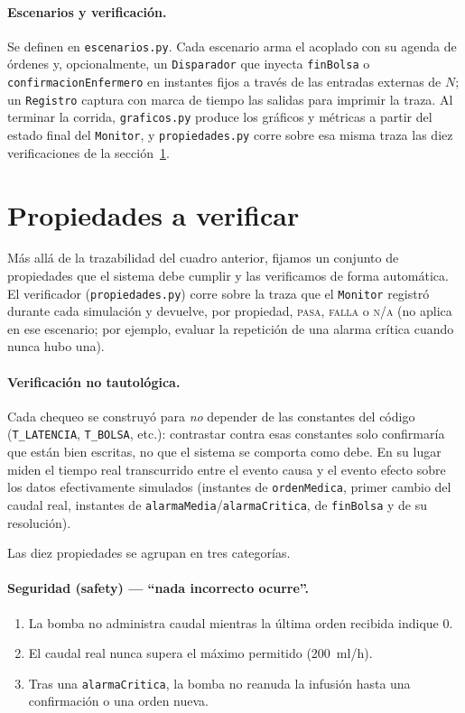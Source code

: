 \documentclass[11pt,a4paper]{article}
\begin{document}
\paragraph{Escenarios y verificación.} Se definen en \texttt{escenarios.py}. Cada escenario arma el acoplado con su agenda de órdenes y, opcionalmente, un \texttt{Disparador} que inyecta \texttt{finBolsa} o \texttt{confirmacionEnfermero} en instantes fijos a través de las entradas externas de $N$; un \texttt{Registro} captura con marca de tiempo las salidas para imprimir la traza. Al terminar la corrida, \texttt{graficos.py} produce los gráficos y métricas a partir del estado final del \texttt{Monitor}, y \texttt{propiedades.py} corre sobre esa misma traza las diez verificaciones de la sección~\ref{sec:propiedades}.

\section{Propiedades a verificar}\label{sec:propiedades}

Más allá de la trazabilidad del cuadro anterior, fijamos un conjunto de propiedades que el sistema debe cumplir y las verificamos de forma automática. El verificador (\texttt{propiedades.py}) corre sobre la traza que el \texttt{Monitor} registró durante cada simulación y devuelve, por propiedad, \textsc{pasa}, \textsc{falla} o \textsc{n/a} (no aplica en ese escenario; por ejemplo, evaluar la repetición de una alarma crítica cuando nunca hubo una).

\paragraph{Verificación no tautológica.} Cada chequeo se construyó para \emph{no} depender de las constantes del código (\texttt{T\_LATENCIA}, \texttt{T\_BOLSA}, etc.): contrastar contra esas constantes solo confirmaría que están bien escritas, no que el sistema se comporta como debe. En su lugar miden el tiempo real transcurrido entre el evento causa y el evento efecto sobre los datos efectivamente simulados (instantes de \texttt{ordenMedica}, primer cambio del caudal real, instantes de \texttt{alarmaMedia}/\texttt{alarmaCritica}, de \texttt{finBolsa} y de su resolución).

Las diez propiedades se agrupan en tres categorías.

\paragraph{Seguridad (safety) --- ``nada incorrecto ocurre''.}
\begin{enumerate}[label=\textbf{S\arabic*.},leftmargin=2.6em]
  \item La bomba no administra caudal mientras la última orden recibida indique 0.
  \item El caudal real nunca supera el máximo permitido (200~ml/h).
  \item Tras una \texttt{alarmaCritica}, la bomba no reanuda la infusión hasta una confirmación o una orden nueva.
\end{enumerate}
\end{document}

